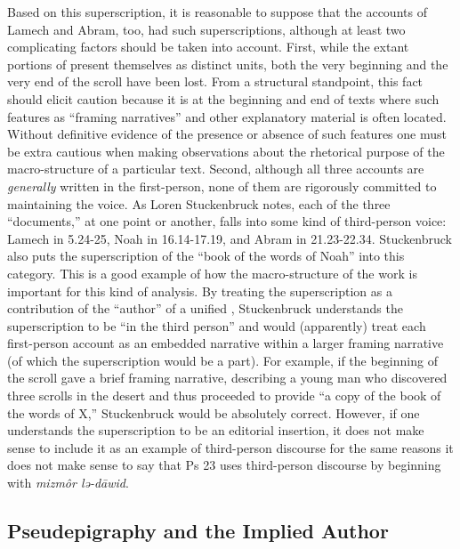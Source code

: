 Based on this superscription, it is reasonable to suppose that the
accounts of Lamech and Abram, too, had such superscriptions, although at
least two complicating factors should be taken into account. First,
while the extant portions of \ga present themselves as
distinct units, both the very beginning and the very end of the scroll
have been lost. From a structural standpoint, this fact should elicit
caution because it is at the beginning and end of texts where such
features as ``framing narratives'' and other explanatory material is
often located. Without definitive evidence of the presence or absence of
such features one must be extra cautious when making observations about
the rhetorical purpose of the macro-structure of a particular text.
Second, although all three accounts are \emph{generally} written in the
first-person, none of them are rigorously committed to maintaining the
voice. As Loren Stuckenbruck notes, each of the three ``documents,'' at
one point or another, falls into some kind of third-person voice: Lamech
in 5.24-25, Noah in 16.14-17.19, and Abram in 21.23-22.34. Stuckenbruck
also puts the superscription of the ``book of the words of Noah'' into
this category. This is a good example of how the macro-structure of the
work is important for this kind of analysis. By treating the
superscription as a contribution of the ``author'' of a unified
\ga, Stuckenbruck understands the superscription to be
``in the third person'' and would (apparently) treat each first-person
account as an embedded narrative within a larger framing narrative (of
which the superscription would be a part). For example, if the beginning
of the scroll gave a brief framing narrative, describing a young man who
discovered three scrolls in the desert and thus proceeded to provide ``a
copy of the book of the words of X,'' Stuckenbruck would be absolutely
correct. However, if one understands the superscription to be an
editorial insertion, it does not make sense to include it as an example
of third-person discourse for the same reasons it does not make sense to
say that Ps 23 uses third-person discourse by beginning with
\emph{mizmôr
lə-dāwid}.\autocites[315--316]{stuckenbruck_roitman-etal2011}[See
also][15--16. Even supposing a single author for \ga, as
Stuckenbruck and others imply, I am still inclined to consider the
superscriptions separately from the former examples because they would
exist outside the frame of each embedded
narrative.]{bernstein_chazon-etal1999}

\hypertarget{pseudepigraphy-and-the-implied-author}{%
\subsection{Pseudepigraphy and the Implied
Author}\label{pseudepigraphy-and-the-implied-author}}

